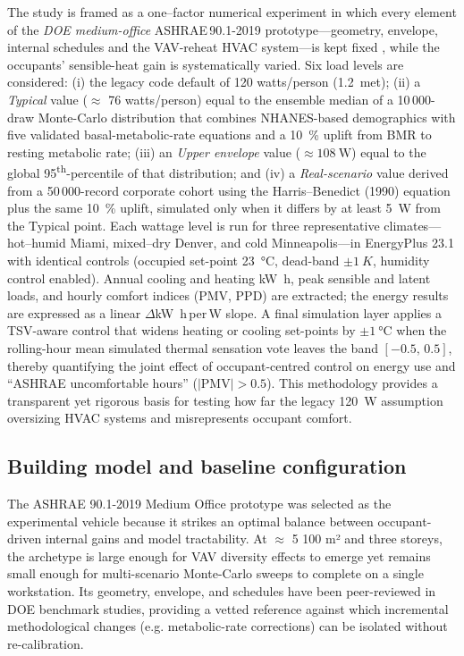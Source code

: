 The study is framed as a one–factor numerical experiment in which every element of the
\textit{DOE medium-office} ASHRAE\,90.1-2019 prototype---geometry, envelope,
internal schedules and the VAV-reheat HVAC system---is kept fixed
\citep{DOEPrototype2018}, while the occupants’ sensible-heat gain is systematically
varied.  Six load levels are considered: (i) the legacy code default of 120 watts/person (\SI{1.2}{met}); (ii) a \emph{Typical} value ($\approx$ 76 watts/person) equal to the ensemble median of a 10\,000-draw Monte-Carlo distribution that combines NHANES-based demographics with five validated basal-metabolic-rate equations and a
\SI{10}{\percent} uplift from BMR to resting metabolic rate; (iii) an \emph{Upper envelope} value ($\approx\!\SI{108}{\watt}$) equal to the global 95\textsuperscript{th}-percentile of that distribution; and (iv) a \emph{Real-scenario} value derived from a 50\,000-record corporate cohort using the Harris--Benedict (1990) equation plus the same \SI{10}{\percent} uplift, simulated only when it differs by at least \SI{5}{\watt} from the Typical point.  Each wattage level is run for three representative climates---hot–humid Miami, mixed–dry Denver, and cold Minneapolis---in EnergyPlus 23.1 with identical controls (occupied set-point \SI{23}{\celsius}, dead-band $\pm\!\SI{1}{K}$, humidity control enabled).  Annual cooling and heating \si{\kilo\watt\hour}, peak sensible and latent loads, and hourly comfort indices (PMV, PPD) are extracted; the energy results are expressed as a linear
$\Delta$\si{\kilo\watt\hour}\,per\,\si{\watt} slope.  A final simulation layer applies a TSV-aware control that widens heating or cooling set-points by $\pm\!\SI{1}{\celsius}$ when the rolling-hour mean simulated thermal sensation vote leaves the band $[-0.5,\,0.5]$, thereby quantifying the joint effect of occupant-centred control on energy use and “ASHRAE uncomfortable hours” ($|{\text{PMV}}|>0.5$).  This methodology provides a transparent yet rigorous basis for testing how far the legacy \SI{120}{\watt} assumption oversizing HVAC systems and misrepresents occupant comfort.

\subsection{Building model and baseline configuration}\label{sec:building}
The ASHRAE 90.1-2019 Medium Office prototype was selected as the experimental vehicle because it strikes an optimal balance between occupant-driven internal gains and model tractability. At $\approx$ 5 100 m² and three storeys, the archetype is large enough for VAV diversity effects to emerge yet remains small enough for multi-scenario Monte-Carlo sweeps to complete on a single workstation. Its geometry, envelope, and schedules have been peer-reviewed in DOE benchmark studies, providing a vetted reference against which incremental methodological changes (e.g. metabolic-rate corrections) can be isolated without re-calibration.

